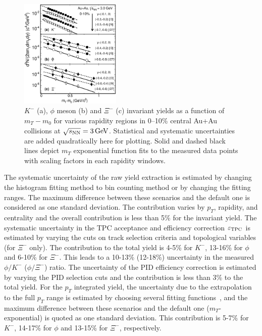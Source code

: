 \documentclass[%
 reprint,	
showpacs,
 amsmath,amssymb,
 aps,
 superscriptaddress,
]{revtex4-1}
\begin{document}
\begin{figure}
\centering
\hspace*{-4mm}
\includegraphics[width=0.43\textwidth]{fig2_mT_spectra.eps}
  \caption{$K^-$ (a), $\phi$ meson (b) and $\Xi^-$ (c) invariant yields as a function of $m_T-m_0$ for various rapidity regions in 0--10\% central Au+Au collisions at ${\sqrt{s_{\rm NN}} = \rm{3\,GeV}}$. Statistical and systematic uncertainties are added quadratically here for plotting. Solid and dashed black lines depict $m_T$ exponential function fits to the measured data points with scaling factors in each rapidity windows.}
\label{fig:phimTSpectra} 
\end{figure}

The systematic uncertainty of the raw yield extraction is estimated by changing the histogram fitting method to bin counting method or by changing the fitting ranges. The maximum difference between these scenarios and the default one is considered as one standard deviation. The contribution varies by $p_T$, rapidity, and centrality and the overall contribution is less than 5\% for the invariant yield. The systematic uncertainty in the TPC acceptance and efficiency correction $\varepsilon_{\rm TPC}$ is estimated by varying the cuts on track selection criteria and topological variables (for $\Xi^-$ only). The contribution to the total yield is 4-5\% for $K^-$, 13-16\% for $\phi$ and 6-10\% for $\Xi^-$. This leads to a 10-13\% (12-18\%) uncertainty in the measured $\phi/K^-$ ($\phi/\Xi^-$) ratio. The uncertainty of the PID efficiency correction is estimated by varying the PID selection cuts and the contribution is less than 3\% to the total yield.
For the $p_T$ integrated yield, the uncertainty due to the extrapolation to the full $p_T$ range is estimated by choosing several fitting functions~\cite{STAR_particleYield}, and the maximum difference between these scenarios and the default one ($m_T$-exponential) is quoted as one standard deviation. This contribution is 5-7\% for $K^-$, 14-17\% for $\phi$ and 13-15\% for $\Xi^-$, respectively.
\end{document}
